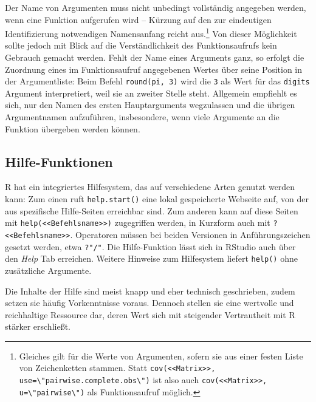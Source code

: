 Der Name von Argumenten muss nicht unbedingt vollständig angegeben werden, wenn eine Funktion aufgerufen wird -- Kürzung auf den zur eindeutigen Identifizierung notwendigen Namensanfang reicht aus.\footnote{Gleiches gilt für die Werte von Argumenten, sofern sie aus einer festen Liste von Zeichenketten stammen. Statt \lstinline!cov(<<Matrix>>, use=\"pairwise.complete.obs\")! ist also auch \lstinline!cov(<<Matrix>>, u=\"pairwise\")! als Funktionsaufruf möglich.} Von dieser Möglichkeit sollte jedoch mit Blick auf die Verständlichkeit des Funktionsaufrufs kein Gebrauch gemacht werden. Fehlt der Name eines Arguments ganz, so erfolgt die Zuordnung eines im Funktionsaufruf angegebenen Wertes über seine Position in der Argumentliste: Beim Befehl \lstinline!round(pi, 3)! wird die \lstinline!3! als Wert für das \lstinline!digits! Argument interpretiert, weil sie an zweiter Stelle steht. Allgemein empfiehlt es sich, nur den Namen des ersten Hauptarguments wegzulassen und die übrigen Argumentnamen aufzuführen, insbesondere, wenn viele Argumente an die Funktion übergeben werden können.

\subsection{Hilfe-Funktionen}
\label{sec:help}

R hat ein integriertes Hilfesystem, das auf verschiedene Arten genutzt werden kann: Zum einen ruft \lstinline!help.start()! eine lokal gespeicherte Webseite auf, von der aus spezifische Hilfe-Seiten erreichbar sind. Zum anderen kann auf diese Seiten mit \lstinline!help(<<Befehlsname>>)! zugegriffen werden, in Kurzform auch mit \lstinline!?<<Befehlsname>>!. Operatoren müssen bei beiden Versionen in Anführungszeichen gesetzt werden, etwa \lstinline!?"/"!. Die Hilfe-Funktion lässt sich in RStudio auch über den \emph{Help} Tab erreichen. Weitere Hinweise zum Hilfesystem liefert \lstinline!help()! ohne zusätzliche Argumente.

Die Inhalte der Hilfe sind meist knapp und eher technisch geschrieben, zudem setzen sie häufig Vorkenntnisse voraus. Dennoch stellen sie eine wertvolle und reichhaltige Ressource dar, deren Wert sich mit steigender Vertrautheit mit R stärker erschließt.


